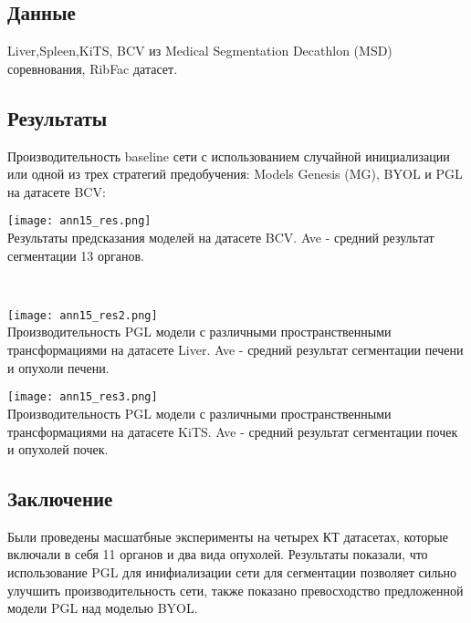 \subsection*{Данные}
Liver,Spleen,KiTS, BCV из Medical Segmentation
Decathlon (MSD) соревнования, RibFac датасет.
\subsection*{Результаты}
Производительность baseline сети с использованием случайной инициализации или одной из трех 
стратегий предобучения: Models Genesis (MG), BYOL и  PGL на датасете BCV:
\\
\begin{minipage}{1.0\linewidth}
    \begin{center}
        \texttt{[image: ann15\_res.png]} \\
        \caption{\scriptsize{Результаты предсказания моделей на датасете BCV. Ave - 
        средний результат сегментации 13 органов.}}
    \end{center}
\end{minipage}

\\
\begin{minipage}{0.49\linewidth}
    \begin{center}
        \texttt{[image: ann15\_res2.png]} \\
        \caption{\scriptsize{
            Производительность PGL модели с различными пространственными 
            трансформациями на датасете Liver. Ave - 
            средний результат сегментации печени и опухоли печени.
        }}
    \end{center}
    
\end{minipage}
\begin{minipage}{0.49\linewidth}
    \begin{center}
        \texttt{[image: ann15\_res3.png]} \\
        \caption{\scriptsize{Производительность PGL модели с 
        различными пространственными 
        трансформациями на датасете KiTS. Ave - 
        средний результат сегментации почек и опухолей почек.}}
    \end{center}
    
\end{minipage} 


\subsection*{Заключение}
Были проведены масшатбные эксперименты на четырех КТ датасетах, которые включали в себя 
11 органов и два вида опухолей. Результаты показали, что использование PGL для инифиализации 
сети для сегментации позволяет сильно улучшить производительность сети, также показано 
превосходство предложенной модели PGL над моделью BYOL.